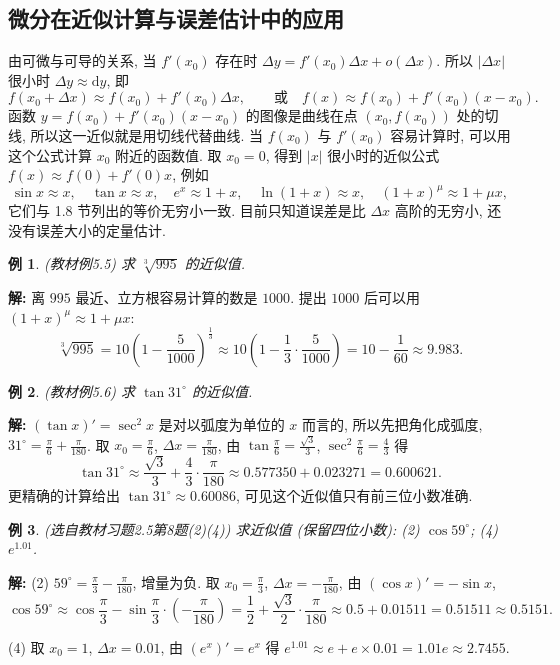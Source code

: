 \documentclass[UTF8,openany]{ctexbook}
\theoremstyle{chinesetextbook}
\newtheorem{example}{例}[section]
\newenvironment{cnsolution}{\par\indent\textbf{解:} \ignorespaces}{\par}
\newcommand{\dd}{\mathrm d}
\begin{document}
\subsection{微分在近似计算与误差估计中的应用}
由可微与可导的关系, 当 $f'(x_0)$ 存在时 $\Delta y=f'(x_0)\Delta x+o(\Delta x)$. 所以 $|\Delta x|$ 很小时 $\Delta y\approx\dd y$, 即
\[
f(x_0+\Delta x)\approx f(x_0)+f'(x_0)\Delta x,\qquad\text{或}\quad f(x)\approx f(x_0)+f'(x_0)(x-x_0).
\]
函数 $y=f(x_0)+f'(x_0)(x-x_0)$ 的图像是曲线在点 $(x_0,f(x_0))$ 处的切线, 所以这一近似就是用切线代替曲线. 当 $f(x_0)$ 与 $f'(x_0)$ 容易计算时, 可以用这个公式计算 $x_0$ 附近的函数值. 取 $x_0=0$, 得到 $|x|$ 很小时的近似公式 $f(x)\approx f(0)+f'(0)x$, 例如
\[
\sin x\approx x,\quad\tan x\approx x,\quad e^x\approx1+x,\quad\ln(1+x)\approx x,\quad(1+x)^\mu\approx1+\mu x,
\]
它们与 1.8 节列出的等价无穷小一致. 目前只知道误差是比 $\Delta x$ 高阶的无穷小, 还没有误差大小的定量估计.
\begin{example}\label{ex:c2-5-5}
\textnormal{(教材例5.5)} 求 $\sqrt[3]{995}$ 的近似值.
\end{example}
\begin{cnsolution}
离 $995$ 最近、立方根容易计算的数是 $1000$. 提出 $1000$ 后可以用 $(1+x)^\mu\approx1+\mu x$:
\[
\sqrt[3]{995}=10\left(1-\frac5{1000}\right)^{\frac13}\approx10\left(1-\frac13\cdot\frac5{1000}\right)=10-\frac1{60}\approx9.983.
\]
\end{cnsolution}
\begin{example}\label{ex:c2-5-6}
\textnormal{(教材例5.6)} 求 $\tan31^\circ$ 的近似值.
\end{example}
\begin{cnsolution}
$(\tan x)'=\sec^2x$ 是对以弧度为单位的 $x$ 而言的, 所以先把角化成弧度, $\displaystyle31^\circ=\frac\pi6+\frac\pi{180}$. 取 $\displaystyle x_0=\frac\pi6$, $\displaystyle\Delta x=\frac\pi{180}$, 由 $\displaystyle\tan\frac\pi6=\frac{\sqrt3}3$, $\displaystyle\sec^2\frac\pi6=\frac43$ 得
\[
\tan31^\circ\approx\frac{\sqrt3}3+\frac43\cdot\frac\pi{180}\approx0.577350+0.023271=0.600621.
\]
更精确的计算给出 $\tan31^\circ\approx0.60086$, 可见这个近似值只有前三位小数准确.
\end{cnsolution}
\begin{example}\label{ex:c2-h5-8}
\textnormal{(选自教材习题2.5第8题(2)(4))} 求近似值 (保留四位小数): (2) $\cos59^\circ$; (4) $e^{1.01}$.
\end{example}
\begin{cnsolution}
(2) $\displaystyle59^\circ=\frac\pi3-\frac\pi{180}$, 增量为负. 取 $\displaystyle x_0=\frac\pi3$, $\displaystyle\Delta x=-\frac\pi{180}$, 由 $(\cos x)'=-\sin x$,
\[
\cos59^\circ\approx\cos\frac\pi3-\sin\frac\pi3\cdot\left(-\frac\pi{180}\right)=\frac12+\frac{\sqrt3}2\cdot\frac\pi{180}\approx0.5+0.01511=0.51511\approx0.5151.
\]

(4) 取 $x_0=1$, $\Delta x=0.01$, 由 $(e^x)'=e^x$ 得 $e^{1.01}\approx e+e\times0.01=1.01e\approx2.7455$.
\end{cnsolution}
\end{document}

